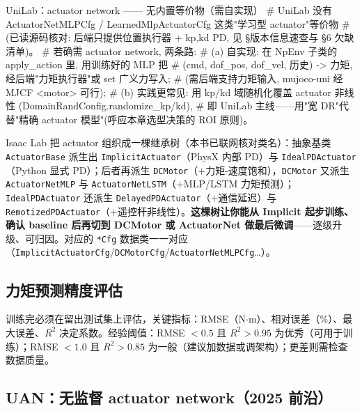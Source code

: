 \begin{codebox}[Python]{UniLab：actuator network —— 无内置等价物（需自实现）}
# UniLab 没有 ActuatorNetMLPCfg / LearnedMlpActuatorCfg 这类"学习型 actuator"等价物
# (已读源码核对: 后端只提供位置执行器 + {kp,kd} PD, 见 §版本信息速查与 §6 欠缺清单)。
# 若确需 actuator network, 两条路:
#   (a) 自实现: 在 NpEnv 子类的 apply_action 里, 用训练好的 MLP 把
#       (cmd, dof_pos, dof_vel, 历史) -> 力矩, 经后端"力矩执行器"或 set 广义力写入;
#       (需后端支持力矩输入, mujoco-uni 经 MJCF <motor> 可行);
#   (b) 实践更常见: 用 kp/kd 域随机化覆盖 actuator 非线性 (DomainRandConfig.randomize_kp/kd),
#       即 UniLab 主线——用"宽 DR"代替"精确 actuator 模型"(呼应本章选型决策的 ROI 原则)。
\end{codebox}

\begin{insight}\label{ins:rlmc-act-tree}
Isaac Lab 把 actuator 组织成一棵继承树（本书已联网核对类名）：抽象基类 \verb|ActuatorBase| 派生出 \verb|ImplicitActuator|（PhysX 内部 PD）与 \verb|IdealPDActuator|（Python 显式 PD）；后者再派生 \verb|DCMotor|（$+$力矩-速度饱和），\verb|DCMotor| 又派生 \verb|ActuatorNetMLP| 与 \verb|ActuatorNetLSTM|（$+$MLP/LSTM 力矩预测）；\verb|IdealPDActuator| 还派生 \verb|DelayedPDActuator|（$+$通信延迟）与 \verb|RemotizedPDActuator|（$+$遥控杆非线性）。\textbf{这棵树让你能从 Implicit 起步训练、确认 baseline 后再切到 DCMotor 或 ActuatorNet 做最后微调}——逐级升级、可归因。对应的 \verb|*Cfg| 数据类一一对应（\verb|ImplicitActuatorCfg|/\verb|DCMotorCfg|/\verb|ActuatorNetMLPCfg|…）。
\end{insight}

\subsection{力矩预测精度评估}
\label{sec:rlmc-act-net-eval}

训练完必须在留出测试集上评估，关键指标：RMSE（N$\cdot$m）、相对误差（\%）、最大误差、$R^2$ 决定系数。经验阈值：RMSE $<0.5$ 且 $R^2>0.95$ 为优秀（可用于训练）；RMSE $<1.0$ 且 $R^2>0.85$ 为一般（建议加数据或调架构）；更差则需检查数据质量。

\subsection{UAN：无监督 actuator network（2025 前沿）}
\label{sec:rlmc-act-net-uan}

